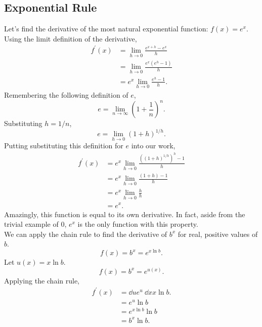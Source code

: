 \subsection{Exponential Rule}
Let's find the derivative of the most natural exponential function: $f(x) = e^x$.
Using the limit definition of the derivative,
\begin{align*}
	f^\prime(x) &= \lim_{h \to 0}{\frac{e^{x+h}-e^x}{h}} \\
	&= \lim_{h \to 0}{\frac{e^x\left(e^h - 1\right)}{h}} \\
	&= e^x \lim_{h \to 0}{\frac{e^h - 1}{h}}.
\end{align*}
Remembering the following definition of $e$,
\begin{equation*}
	e = \lim_{n \to \infty}{\left(1+\frac{1}{n}\right)^n}.
\end{equation*}
Substituting $h = 1/n$,
\begin{equation*}
	e = \lim_{h \to 0}{\left(1+h\right)^{1/h}}.
\end{equation*}
Putting substituting this definition for $e$ into our work,
\begin{align*}
	f^\prime(x) &= e^x \lim_{h \to 0}{\frac{\left(\left(1+h\right)^{1/h}\right)^h-1}{h}} \\
	&= e^x \lim_{h \to 0}{\frac{\left(1+h\right)-1}{h}} \\
	&= e^x \lim_{h \to 0}{\frac{h}{h}} \\
	&= e^x.
\end{align*}
Amazingly, this function is equal to its own derivative. In fact, aside from the trivial example of $0$, $e^x$ is the only function with this property. \\


We can apply the chain rule to find the derivative of $b^x$ for real, positive values of $b$.
\begin{equation*}
	f(x) = b^x	= e^{x\ln{b}}.
\end{equation*}
Let $u(x) = x\ln{b}$.
\begin{equation*}
	f(x) = b^x = e^{u(x)}.
\end{equation*}
Applying the chain rule,
\begin{align*}
	f^\prime(x) &= \dd{}{u}e^u \hspace{3pt} \dd{}{x}x\ln{b}. \\
	&= e^u \ln{b} \\
	&= e^{x\ln{b}} \ln{b} \\
	&= b^x \ln{b}.
\end{align*}

